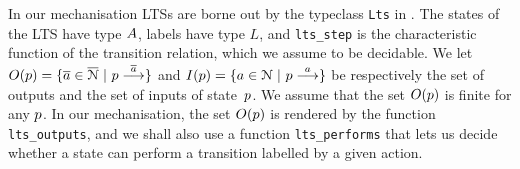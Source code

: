 In our mechanisation LTSs are borne out by the typeclass
\texttt{Lts} in . The states of the LTS
have type $A$, labels have type $L$, and \texttt{lts_step} is
the characteristic function of the transition relation, which we
assume to be decidable.  We let $O(p) = \{  \overline{a} \in \overline{\mathcal{N} } \ |\   p  \mathrel{\overset{ \overline{a}}\longrightarrow}  \}$
and $I(p) = \{  a \in \mathcal{N}  \ |\   p \mathrel{\overset{ a}\longrightarrow}  \}$ be respectively the set of
outputs and the set of inputs of state~$p$.  %
We assume that the set $O(p)$
  is finite for any $p$.
  In our mechanisation, the set
$O(p)$ is rendered by the function \texttt{lts_outputs},
and we shall also use a function \texttt{lts_performs} that
lets us decide whether a state can
perform a transition labelled by a given action.


%
%





